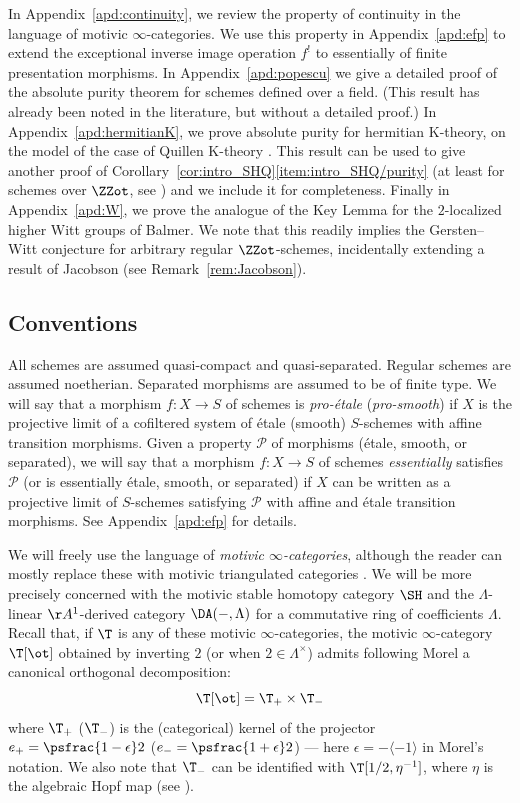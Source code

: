 In Appendix~\ref{apd:continuity}, we review the property of continuity in the language of motivic $\infty$-categories.
We use this property in Appendix~\ref{apd:efp} to extend the exceptional inverse image operation $f^!$ to essentially of finite presentation morphisms.
In Appendix~\ref{apd:popescu} we give a detailed proof of the absolute purity theorem for schemes defined over a field. (This result has already been noted in the literature, but without a detailed proof.)
In Appendix~\ref{apd:hermitianK}, we prove absolute purity for hermitian K-theory,
on the model of the case of Quillen K-theory \cite[Th.\,13.6.3]{CD3}.
This result can be used to give another proof of Corollary~\ref{cor:intro_SHQ}\eqref{item:intro_SHQ/purity} (at least for schemes over $\ZZot$, see \cite{DFJKBorel}) and we include it for completeness.
Finally in Appendix~\ref{apd:W}, we prove the analogue of the Key Lemma for the $2$-localized higher Witt groups of Balmer.
We note that this readily implies the Gersten--Witt conjecture for arbitrary regular $\ZZot$-schemes,
incidentally extending a result of Jacobson (see Remark~\ref{rem:Jacobson}).

\subsection*{Conventions}

All schemes are assumed quasi-compact and quasi-separated.
Regular schemes are assumed noetherian.
Separated morphisms are assumed to be of finite type.
We will say that a morphism $f:X \to S$ of schemes is \emph{pro-étale} (\resp \emph{pro-smooth}) if $X$ is the projective limit of a cofiltered system of étale (\resp smooth) $S$-schemes with affine transition morphisms.
Given a property $\mathcal P$ of morphisms (\eg étale, smooth, or separated), we will say that a morphism $f:X \to S$ of schemes \emph{essentially} satisfies $\mathcal P$ (or is essentially étale, smooth, or separated) if $X$ can be written as a projective limit of $S$-schemes satisfying $\mathcal P$ with affine and étale transition morphisms.
See Appendix~\ref{apd:efp} for details.

We will freely use the language of \emph{motivic $\infty$-categories}, although the reader can mostly replace these with motivic triangulated categories \cite{CD3}.
We will be more precisely concerned with the motivic stable homotopy category $\SH$ and the $\Lambda$-linear $\AA^1$-derived category $\DA(-,\Lambda)$ for a commutative ring of coefficients $\Lambda$.
Recall that, if $\T$ is any of these motivic $\infty$-categories,
the motivic $\infty$-category $\T[\ot]$ obtained by inverting $2$ (or when $2 \in \Lambda^\times$) admits
following Morel a canonical orthogonal decomposition:
\begin{equation*}\label{eq:+-decomposition}
\T[\ot] = \T_+ \times \T_-
\end{equation*}
where $\T_+$ (\resp $\T_-$) is the (categorical) kernel of the projector
$e_+=\psfrac{1-\epsilon} 2$ (\resp $e_-=\psfrac{1+\epsilon} 2$)
--- here $\epsilon=-\langle -1\rangle$ in Morel's notation.
We also note that $\T_-$ can be identified with $\T[1/2,\eta^{-1}]$, where $\eta$ is the algebraic Hopf map (see \eg \cite[Rem.\,3.6]{ALP}).

